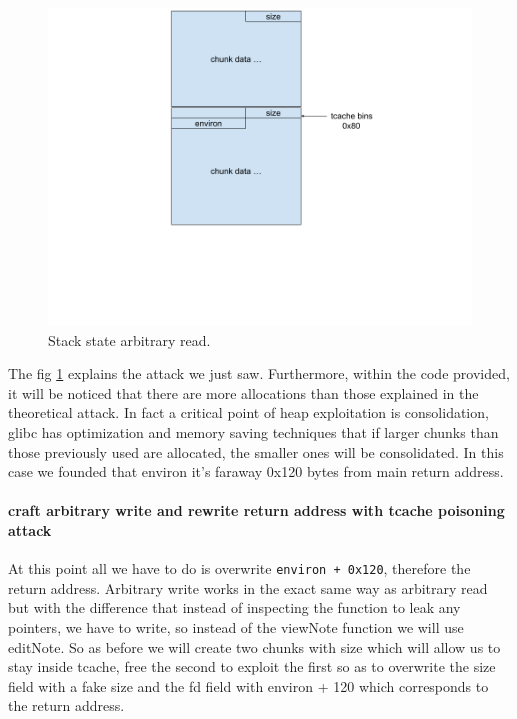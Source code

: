     \begin{figure}[htbp]
        \centering
        \includegraphics[width=1\linewidth]{Images/arb_read_heapchall.png}
        \caption{Stack state arbitrary read.}
        \label{fig:arb_read}
    \end{figure}

    
      The fig \ref{fig:arb_read} explains the attack we just saw.\newline
    Furthermore, within the code provided, it will be noticed that there are more allocations than those explained in the theoretical attack.\newline
    In fact a critical point of heap exploitation is consolidation, glibc has optimization and memory saving techniques that if larger chunks than those previously used are allocated, the smaller ones will be consolidated.
    In this case we founded that environ it's faraway 0x120 bytes from main return address.\newline
    \clearpage
    \paragraph{craft arbitrary write and rewrite return address with tcache poisoning attack}
    At this point all we have to do is overwrite \texttt{environ + 0x120}, therefore the return address.\newline
    Arbitrary write works in the exact same way as arbitrary read but with the difference that instead of inspecting the function to leak any pointers, we have to write, so instead of the viewNote function we will use editNote.\newline
    So as before we will create two chunks with size which will allow us to stay inside tcache, free the second to exploit the first so as to overwrite the size field with a fake size and the fd field with environ + 120 which corresponds to the return address.\newline
   
